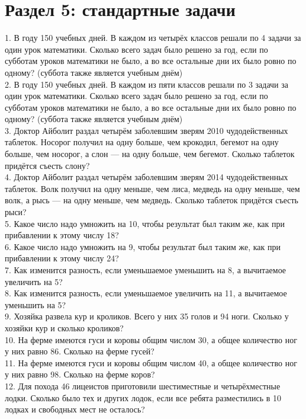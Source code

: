 \documentclass[12pt]{article}
\begin{document}
\section{Раздел 5: стандартные задачи}
1. В году 150 учебных дней. В каждом из четырёх классов решали по 4 задачи за один урок математики. Сколько всего задач было решено за год, если по субботам уроков математики не было, а во все остальные дни их было ровно по одному? (суббота также является учебным днём)\\
2. В году 150 учебных дней. В каждом из пяти классов решали по 3 задачи за один урок математики. Сколько всего задач было решено за год, если по субботам уроков математики не было, а во все остальные дни их было ровно по одному? (суббота также является учебным днём)\\
3. Доктор Айболит раздал четырём заболевшим зверям 2010 чудодейственных таблеток. Носорог получил на одну больше, чем крокодил, бегемот на одну больше, чем носорог, а слон --- на одну больше, чем бегемот. Сколько таблеток придётся съесть слону?\\
4. Доктор Айболит раздал четырём заболевшим зверям 2014 чудодейственных таблеток. Волк получил на одну меньше, чем лиса, медведь на одну меньше, чем волк, а рысь --- на одну меньше, чем медведь. Сколько таблеток придётся съесть рыси?\\
5. Какое число надо умножить на 10, чтобы результат был таким же, как при прибавлении к этому числу 18?\\
6. Какое число надо умножить на 9, чтобы результат был таким же, как при прибавлении к этому числу 24?\\
7. Как изменится разность, если уменьшаемое уменьшить на 8, а вычитаемое увеличить на 5?\\
8. Как изменится разность, если уменьшаемое увеличить на 11, а вычитаемое уменьшить на 5?\\
9. Хозяйка развела кур и кроликов. Всего у них 35 голов и 94 ноги. Сколько у хозяйки кур и сколько кроликов?\\
10. На ферме имеются гуси и коровы общим числом 30, а общее количество ног у них равно 86. Сколько на ферме гусей?\\
11. На ферме имеются гуси и коровы общим числом 40, а общее количество ног у них равно 98. Сколько на ферме коров?\\
12. Для похода 46 лицеистов приготовили шестиместные и четырёхместные лодки. Сколько было тех и других лодок, если все ребята разместились в 10 лодках и свободных мест не осталось?\\
\end{document}
